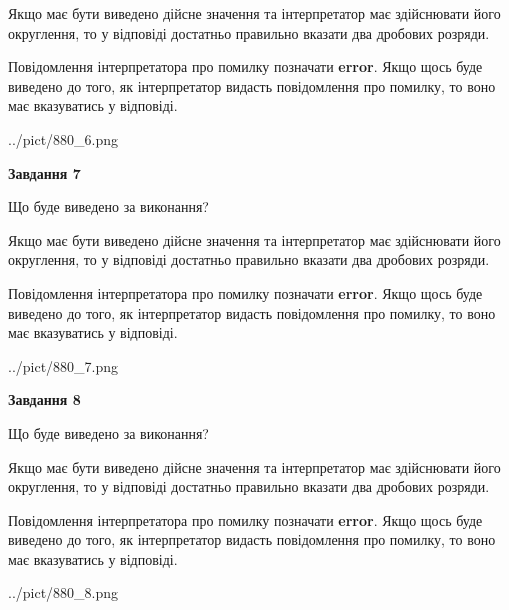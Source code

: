 \documentclass[12pt, ukrainian]{article}
\begin{document}
{\begin {Large}
Якщо має бути виведено дійсне значення та інтерпретатор має здійснювати його округлення, 
то у відповіді достатньо правильно вказати два дробових розряди.

Повідомлення інтерпретатора про помилку позначати \textbf{error}.
Якщо щось буде виведено до того, як інтерпретатор видасть повідомлення про помилку, 
то воно має вказуватись у відповіді. \par

\begin{center}
	{../pict/880_6.png}
\end{center}
\newpage

{\begin {center}\textbf{Завдання 7}\end {center}}\par
Що буде виведено за виконання? \par

Якщо має бути виведено дійсне значення та інтерпретатор має здійснювати його округлення, 
то у відповіді достатньо правильно вказати два дробових розряди.

Повідомлення інтерпретатора про помилку позначати \textbf{error}.
Якщо щось буде виведено до того, як інтерпретатор видасть повідомлення про помилку, 
то воно має вказуватись у відповіді. \par

\begin{center}
	{../pict/880_7.png}
\end{center}
\newpage

{\begin {center}\textbf{Завдання 8}\end {center}}\par
Що буде виведено за виконання? \par

Якщо має бути виведено дійсне значення та інтерпретатор має здійснювати його округлення, 
то у відповіді достатньо правильно вказати два дробових розряди.

Повідомлення інтерпретатора про помилку позначати \textbf{error}.
Якщо щось буде виведено до того, як інтерпретатор видасть повідомлення про помилку, 
то воно має вказуватись у відповіді. \par

\begin{center}
	{../pict/880_8.png}
\end{center}
\newpage


\end{Large}}
\end{document}
